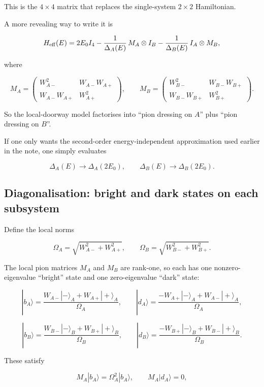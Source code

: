 \documentclass[
]{article}
\renewcommand{\[}{\begin{equation}}
\renewcommand{\]}{\end{equation}}
\begin{document}
This is the \(4\times4\) matrix that replaces the single-system
\(2\times2\) Hamiltonian.

A more revealing way to write it is

\[
H_{\rm eff}(E) =
2E_0 I_4 -
\frac{1}{\Delta_A(E)}\,M_A\otimes I_B -
\frac{1}{\Delta_B(E)}\,I_A\otimes M_B,
\label{eq:HABfactorised}
\]

where

\[
M_A=
\begin{pmatrix}
W_{A-}^2 & W_{A-}W_{A+} \\
W_{A-}W_{A+} & W_{A+}^2
\end{pmatrix},
\qquad
M_B=
\begin{pmatrix}
W_{B-}^2 & W_{B-}W_{B+} \\
W_{B-}W_{B+} & W_{B+}^2
\end{pmatrix}.
\label{eq:MAMB}
\]

So the local-doorway model factorises into ``pion dressing on \(A\)''
plus ``pion dressing on \(B\)''.

If one only wants the second-order energy-independent approximation used
earlier in the note, one simply evaluates

\[
\Delta_A(E)\to \Delta_A(2E_0),
\qquad
\Delta_B(E)\to \Delta_B(2E_0).
\label{eq:ABfixedGapApprox}
\]

\subsection{Diagonalisation: bright and dark states on each
subsystem}\label{diagonalisation-bright-and-dark-states-on-each-subsystem}

Define the local norms

\[
\Omega_A=\sqrt{W_{A-}^2+W_{A+}^2},
\qquad
\Omega_B=\sqrt{W_{B-}^2+W_{B+}^2}.
\label{eq:OmegaAB}
\]

The local pion matrices \(M_A\) and \(M_B\) are rank-one, so each has
one nonzero-eigenvalue ``bright'' state and one zero-eigenvalue ``dark''
state:

\[
|b_A\rangle=
\frac{W_{A-}|-\rangle_A+W_{A+}|+\rangle_A}{\Omega_A},
\qquad
|d_A\rangle=
\frac{-W_{A+}|-\rangle_A+W_{A-}|+\rangle_A}{\Omega_A},
\label{eq:brightdarkA}
\]

\[
|b_B\rangle=
\frac{W_{B-}|-\rangle_B+W_{B+}|+\rangle_B}{\Omega_B},
\qquad
|d_B\rangle=
\frac{-W_{B+}|-\rangle_B+W_{B-}|+\rangle_B}{\Omega_B}.
\label{eq:brightdarkB}
\]

These satisfy

\[
M_A|b_A\rangle=\Omega_A^2|b_A\rangle,
\qquad
M_A|d_A\rangle=0,
\label{eq:MAeig}
\]
\end{document}
